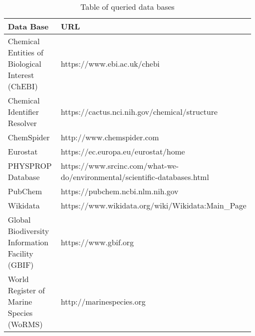 \begin{table}[ht]
  \caption{Table of queried data bases}
  \label{tab:data-base-additional}
  \centering
\begin{tabular}{ll}
  \hline
  Data Base & URL \\ 
  \hline
  Chemical Entities of Biological Interest (ChEBI) & https://www.ebi.ac.uk/chebi \\ 
  Chemical Identifier Resolver & https://cactus.nci.nih.gov/chemical/structure \\
  ChemSpider & http://www.chemspider.com \\
  Eurostat & https://ec.europa.eu/eurostat/home \\
  PHYSPROP Database & https://www.srcinc.com/what-we-do/environmental/scientific-databases.html \\
  PubChem & https://pubchem.ncbi.nlm.nih.gov \\ 
  Wikidata & https://www.wikidata.org/wiki/Wikidata:Main_Page \\
  Global Biodiversity Information Facility (GBIF) & https://www.gbif.org \\
  World Register of Marine Species (WoRMS) & http://marinespecies.org \\
  \hline
\end{tabular}
\end{table}
